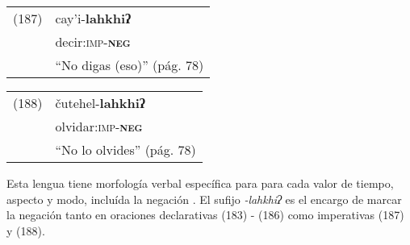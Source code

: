 {%
\begin{tabular}{ll}
(187) & cay'i-\textbf{lahkhiʔ} \\
& decir:\textsc{imp-\textbf{neg}} \\
& ``No digas (eso)'' (pág. 78)
\end{tabular} \vspace{0.5cm}

\begin{tabular}{ll}
(188) & čutehel-\textbf{lahkhiʔ} \\
& olvidar:\textsc{imp-\textbf{neg}}\\
& ``No lo olvides'' (pág. 78)
\end{tabular} \vspace{0.5cm}

}

Esta lengua tiene morfología verbal específica para para cada valor de tiempo, aspecto y modo, incluída la negación \textcolor{MidnightBlue}{\citep{wappo}}. El sufijo {\setmainfont{Charis SIL} \textit{-lahkhiʔ}} es el encargo de marcar la negación tanto en oraciones declarativas (183) - (186) como imperativas (187) y (188).
